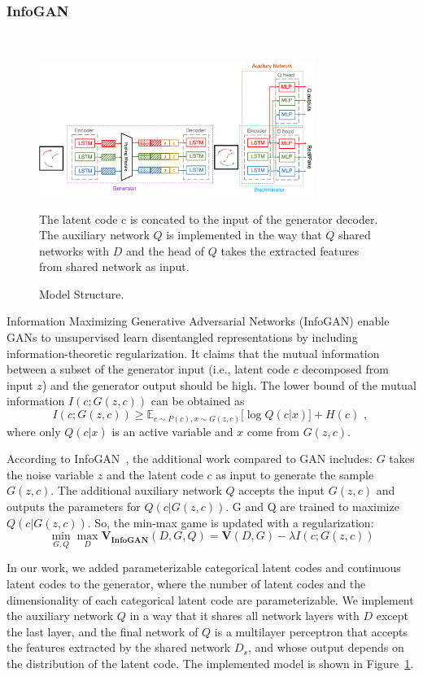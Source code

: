 \subsubsection{InfoGAN}
\hfill \\
\begin{figure}[ht]
  \centering
  \includegraphics[width=0.8\textwidth]{figures/arch.png}
  \caption{Model Structure. }{The latent code c is concated to the input of the generator decoder. The auxiliary network $Q$ is implemented in the way that $Q$ shared networks with $D$ and the head of $Q$ takes the extracted features from shared network as input.}
  \label{arch}
\end{figure}
Information Maximizing Generative Adversarial Networks (InfoGAN) enable GANs to unsupervised learn disentangled representations by including information-theoretic regularization. It claims that the mutual information between a subset of the generator input (i.e., latent code $c$ decomposed from input $z$) and the generator output should be high. The lower bound of the mutual information $I(c; G(z, c))$ can be obtained as $$I(c; G(z, c)) \geq \mathbb{E}_{c \sim P(c), x \sim G(z, c)} \lbrack \log Q(c | x) \rbrack + H(c) \text{ , }$$ where only $Q(c | x)$ is an active variable and $x$ come from $G(z, c)$.

According to InfoGAN~\cite{infogan}, the additional work compared to GAN includes: $G$ takes the noise variable $z$ and the latent code $c$ as input to generate the sample $G(z, c)$. The additional auxiliary network $Q$ accepts the input $G(z, c)$ and outputs the parameters for $Q(c|G(z, c))$. G and Q are trained to maximize $Q(c | G(z, c))$. So, the min-max game is updated with a regularization: \[\min_{G,Q}\max_{D} \mathbf{V_{InfoGAN}}(D, G, Q) = \mathbf{V}(D, G) - \lambda I(c; G(z, c)) \]

In our work, we added parameterizable categorical latent codes and continuous latent codes to the generator, where the number of latent codes and the dimensionality of each categorical latent code are parameterizable. We implement the auxiliary network $Q$ in a way that it shares all network layers with $D$ except the last layer, and the final network of $Q$ is a multilayer perceptron that accepts the features extracted by the shared network $D_s$, and whose output depends on the distribution of the latent code. The implemented model is shown in Figure~\ref{arch}.

